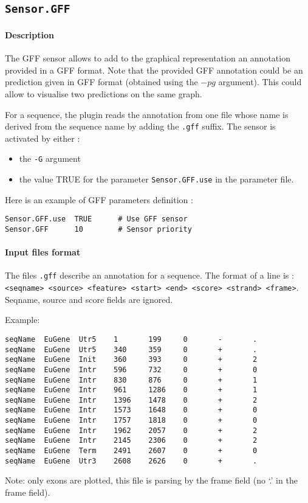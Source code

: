 
\subsection{\texttt{Sensor.GFF}}

\paragraph{Description}

The GFF sensor allows to add to the graphical representation an
annotation provided in a GFF format. Note that the provided GFF
annotation could be an \EuGene prediction given in GFF format
(obtained using the $-pg$ argument). This could allow to visualise two
predictions on the same graph.

For a sequence, the plugin reads the annotation from one file whose
name is derived from the sequence name by adding the \texttt{.gff}
suffix.  The sensor is activated by either :
\begin{itemize}
\item the \texttt{-G} argument 
\item the value TRUE for the parameter \texttt{Sensor.GFF.use} in the
  parameter file.
\end{itemize}
Here is an example of GFF parameters definition :
\begin{Verbatim}[fontsize=\small]
Sensor.GFF.use  TRUE      # Use GFF sensor
Sensor.GFF      10        # Sensor priority
\end{Verbatim}

\paragraph{Input files format}

The files \texttt{.gff} describe an annotation for a sequence. The format of
a line is : \texttt{<seqname> <source> <feature> <start> <end> <score>
  <strand> <frame>}. Seqname, source and score fields are ignored.

Example:
\begin{Verbatim}[fontsize=\small]
seqName  EuGene  Utr5    1       199     0       -       .
seqName  EuGene  Utr5    340     359     0       +       .
seqName  EuGene  Init    360     393     0       +       2
seqName  EuGene  Intr    596     732     0       +       0
seqName  EuGene  Intr    830     876     0       +       1
seqName  EuGene  Intr    961     1286    0       +       1
seqName  EuGene  Intr    1396    1478    0       +       2
seqName  EuGene  Intr    1573    1648    0       +       0
seqName  EuGene  Intr    1757    1818    0       +       0
seqName  EuGene  Intr    1962    2057    0       +       2
seqName  EuGene  Intr    2145    2306    0       +       2
seqName  EuGene  Term    2491    2607    0       +       0
seqName  EuGene  Utr3    2608    2626    0       +       .
\end{Verbatim}
Note: only exons are plotted, this file is parsing by the frame field
(no `.' in the frame field).

